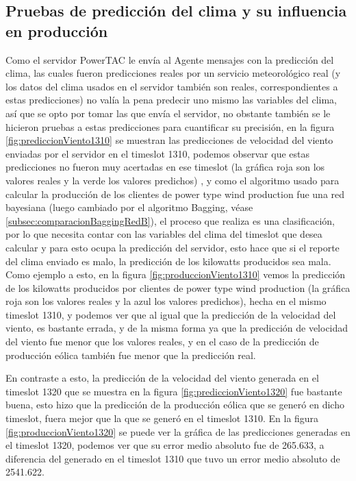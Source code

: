 \subsection{Pruebas de predicción del clima y su influencia en producción} \label{subsec:prediccionClimaProduccion}

Como el servidor PowerTAC le envía al Agente mensajes con la predicción del clima, las cuales fueron predicciones reales por un servicio meteorológico real (y los datos del clima usados en el servidor también son reales, correspondientes a estas predicciones) no valía la pena predecir uno mismo las variables del clima, así que se opto por tomar las que envía el servidor, no obstante también se le hicieron pruebas a estas predicciones para cuantificar su precisión, en la figura \ref{fig:prediccionViento1310} se muestran las predicciones de velocidad del viento enviadas por el servidor en el timeslot 1310, podemos observar que estas predicciones no fueron muy acertadas en ese timeslot (la gráfica roja son los valores reales y la verde los valores predichos) , y como el algoritmo usado para calcular la producción de los clientes de power type wind production fue una red bayesiana (luego cambiado por el algoritmo Bagging, véase \ref{subsec:comparacionBaggingRedB}), el proceso que realiza es una clasificación, por lo que necesita contar con las variables del clima del timeslot que desea calcular y para esto ocupa la predicción del servidor, esto hace que si el reporte del clima enviado es malo, la predicción de los kilowatts producidos sea mala. Como ejemplo a esto, en la figura \ref{fig:produccionViento1310} vemos la predicción de los kilowatts producidos por clientes de power type wind production (la gráfica roja son los valores reales y la azul los valores predichos), hecha en el mismo timeslot 1310, y podemos ver que al igual que la predicción de la velocidad del viento, es bastante errada, y de la misma forma ya que la predicción de velocidad del viento fue menor que los valores reales, y en el caso de la predicción de producción eólica también fue menor que la predicción real.

En contraste a esto, la predicción de la velocidad del viento generada en el timeslot 1320 que se muestra en la figura \ref{fig:prediccionViento1320} fue bastante buena, esto hizo que la predicción de la producción eólica que se generó en dicho timeslot, fuera mejor que la que se generó en el timeslot 1310. En la figura \ref{fig:produccionViento1320} se puede ver la gráfica de las predicciones generadas en el timeslot 1320, podemos ver que su error medio absoluto fue de 265.633, a diferencia del generado en el timeslot 1310 que tuvo un error medio absoluto de 2541.622.

